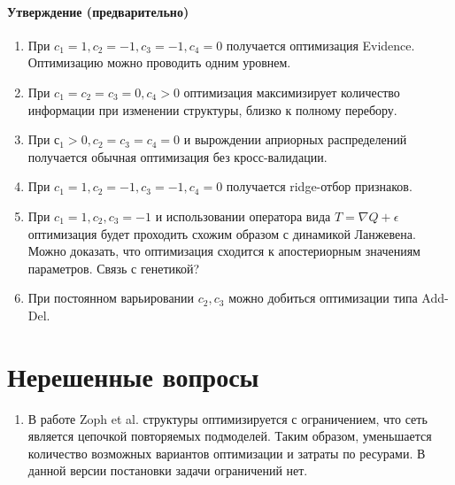 \documentclass[12pt]{article}
\begin{document}
\paragraph{Утверждение (предварительно)}
\begin{enumerate}
\item При $c_1 = 1, c_2 = -1, c_3 = -1, c_4 = 0 $ получается оптимизация Evidence. Оптимизацию можно проводить одним уровнем.
\item При $c_1 = c_2 = c_3 = 0, c_4 > 0$ оптимизация максимизирует количество информации при изменении структуры, близко к полному перебору.
\item При $с_1 > 0, c_2= c_3=c_4=0$ и вырождении априорных распределений получается обычная оптимизация без кросс-валидации.
\item При $c_1 = 1, c_2 = -1, c_3 = -1, c_4 = 0 $  получается ridge-отбор признаков.
\item При $c_1 = 1, c_2, c_3 = -1$ и использовании оператора вида $T = \nabla Q + \epsilon$ оптимизация будет проходить схожим образом с динамикой Ланжевена. Можно доказать, что оптимизация сходится к апостериорным значениям параметров. Связь с генетикой?
\item При постоянном варьировании $c_2, c_3$ можно добиться оптимизации типа Add-Del.
\end{enumerate} 

\section{Нерешенные вопросы}
\begin{enumerate}
\item В работе Zoph et al. структуры оптимизируется с ограничением, что сеть является цепочкой повторяемых подмоделей. Таким образом, уменьшается количество возможных вариантов оптимизации и затраты по ресурами. В данной версии постановки задачи ограничений нет.
\end{enumerate}
\end{document}
